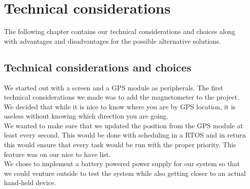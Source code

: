 \chapter{Technical considerations}
The following chapter contains our technical considerations and choices along with advantages and disadvantages for the possible alternative solutions. \\

\section{Technical considerations and choices}
We started out with a screen and a GPS module as peripherals. The first technical considerations we made was to add the magnetometer to the project. We decided that while it is nice to know where you are by GPS location, it is useless without knowing which direction you are going.\\

We wanted to make sure that we updated the position from the GPS module at least every second. This would be done with scheduling in a RTOS and in return this would ensure that every task would be run with the proper priority. This feature was on our nice to have list.\\

We chose to implement a battery powered power supply for our system so that we could venture outside to test the system while also getting closer to an actual hand-held device. \\


